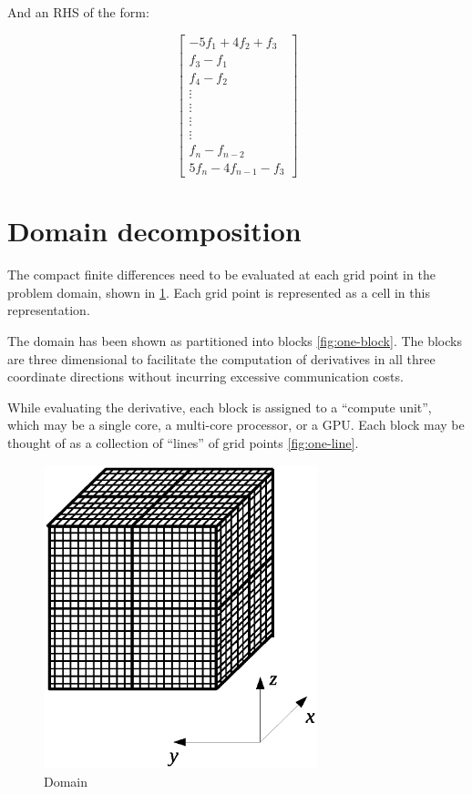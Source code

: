 \documentclass{article}
\begin{document}
And an RHS of the form:

\[
 \begin{bmatrix}
     -5f_1 + 4f_2 + f_3\\
     f_{3} - f_{1}\\
     f_{4} - f_{2}\\
     \vdots\\
     \vdots\\
     \vdots\\
     \vdots\\
     f_{n} - f_{n-2}\\
     5f_{n} - 4f_{n-1} - f_{3}
  \end{bmatrix}
\]

\section{Domain decomposition}

The compact finite differences need to be evaluated
at each grid point in the problem domain,
shown in \ref{fig:domain}.
Each grid point is represented as a cell in this representation.

The domain has been shown as partitioned into blocks \ref{fig:one-block}.
The blocks are three dimensional to facilitate
the computation of derivatives in all three coordinate directions
without incurring excessive communication costs.

While evaluating the derivative, each block is assigned to a ``compute unit'',
which may be a single core, a multi-core processor, or a GPU.
Each block may be thought of as a collection of ``lines'' of grid points
\ref{fig:one-line}.





\begin{figure}[h]
\begin{center}
\includegraphics[trim={{100pt} {150pt} {100pt} {150pt}}, clip, height=250pt]{img/domain.eps}
\end{center}
\caption{Domain}
\label{fig:domain}
\end{figure}
\end{document}
